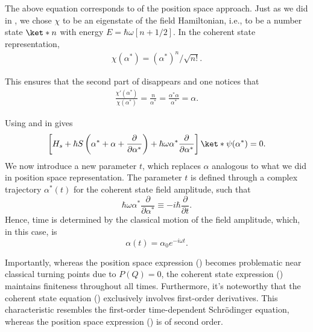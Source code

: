 The above equation corresponds to  of the position space approach. 
Just as we did in , we chose \(\chi\) to be an eigenstate of the field 
Hamiltonian, i.e., to be a number state \(\ket*{n}\) with energy \(E = \hbar \omega \left[n + 1/2\right]\).
In the coherent state representation, 
\begin{eqnarray}
    \label{eq:class_jcm_eq24}
    \chi(\alpha^*) =  (\alpha^*)^n/\sqrt{n!}. 
\end{eqnarray}

This ensures that the second part of  disappears and one notices that
\begin{eqnarray}
    \label{eq:class_jcm_eq25}   
    \frac{\chi'(\alpha^*)}{\chi(\alpha^*)} = \frac{n}{\alpha^*} = \frac{\alpha^*\alpha}{\alpha^*} = \alpha.
\end{eqnarray}

Using  and  in  gives
\begin{equation}
    \label{eq:class_jcm_eq26}
    \left[H_s + \hbar S \left(\alpha^* + \alpha + 
    \dfrac{\partial}{\partial  \alpha^*}\right) 
    + \hbar \omega \alpha^* \dfrac{\partial}{\partial \alpha^*} \right] \ket*{\psi(\alpha^*)} = 0.
\end{equation}
We now introduce a new parameter \(t\), which replaces \(\alpha\) analogous to what we did 
in position space representation. The parameter \(t\) is defined through a complex trajectory 
\(\alpha^*(t)\) for the coherent state field amplitude, such that 
\begin{equation}
    \label{eq:class_jcm_eq27}
    \hbar \omega \alpha^* \dfrac{\partial}{\partial \alpha^*} \equiv 
    -i \hbar\dfrac{\partial}{\partial t}.
 \end{equation}
Hence, time is determined by the classical motion of the field amplitude, which, in this case, is 
\begin{equation}
    \label{eq:class_jcm_eq28}
    \alpha(t) = \alpha_0 e^{-i\omega t}.
\end{equation}

Importantly, whereas the position space expression () becomes 
problematic near classical turning 
points due to $P(Q) = 0$, the coherent state expression () maintains finiteness throughout all times. 
Furthermore, it's noteworthy that the coherent state equation () exclusively involves first-order 
derivatives. This characteristic resembles the first-order time-dependent Schrödinger 
equation, whereas the position space expression () is of second order.

